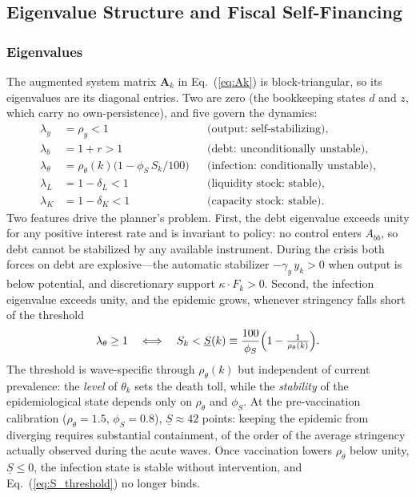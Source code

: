 \documentclass[12pt, a4paper]{article}
\begin{document}
\subsection{Eigenvalue Structure and Fiscal Self-Financing}
\label{app:stability}

\subsubsection*{Eigenvalues}

The augmented system matrix $\bm{A}_k$ in Eq.~(\ref{eq:Ak}) is block-triangular, so
its eigenvalues are its diagonal entries. Two are zero (the bookkeeping states
$d$ and $z$, which carry no own-persistence), and five govern the dynamics:
%
\begin{align}
    \lambda_y      &= \rho_y < 1 && \text{(output: self-stabilizing)}, \\
    \lambda_b      &= 1 + r > 1 && \text{(debt: unconditionally unstable)}, \\
    \lambda_\theta &= \rho_\theta(k)\bigl(1 - \phi_S\, S_k/100\bigr)
                      && \text{(infection: conditionally unstable)}, \\
    \lambda_L      &= 1 - \delta_L < 1 && \text{(liquidity stock: stable)}, \\
    \lambda_K      &= 1 - \delta_K < 1 && \text{(capacity stock: stable)}.
\end{align}
%
Two features drive the planner's problem. First, the debt eigenvalue exceeds unity
for any positive interest rate and is invariant to policy: no control enters
$A_{bb}$, so debt cannot be stabilized by any available instrument. During the
crisis both forces on debt are explosive---the automatic stabilizer
$-\gamma_y\, y_k > 0$ when output is below potential, and discretionary support
$\kappa\cdot F_k > 0$. Second, the infection eigenvalue exceeds unity, and the
epidemic grows, whenever stringency falls short of the threshold
%
\begin{equation}
    \lambda_\theta \ge 1
    \quad\Longleftrightarrow\quad
    S_k < \underline{S}(k) \equiv
    \frac{100}{\phi_S}\Bigl(1 - \tfrac{1}{\rho_\theta(k)}\Bigr).
    \label{eq:S_threshold}
\end{equation}
%
The threshold is wave-specific through $\rho_\theta(k)$ but independent of current
prevalence: the \emph{level} of $\theta_k$ sets the death toll, while the
\emph{stability} of the epidemiological state depends only on $\rho_\theta$ and
$\phi_S$. At the pre-vaccination calibration ($\rho_\theta = 1.5$,
$\phi_S = 0.8$), $\underline{S} \approx 42$ points: keeping the epidemic from
diverging requires substantial containment, of the order of the average
stringency actually observed during the acute waves. Once vaccination lowers
$\rho_\theta$ below unity, $\underline{S} \le 0$, the infection state is stable
without intervention, and Eq.~(\ref{eq:S_threshold}) no longer binds.
\end{document}
